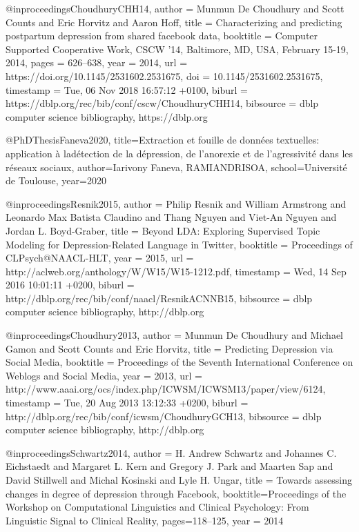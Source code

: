 @inproceedings{ChoudhuryCHH14,
	author    = {Munmun De Choudhury and
	Scott Counts and
	Eric Horvitz and
	Aaron Hoff},
	title     = {Characterizing and predicting postpartum depression from shared facebook
	data},
	booktitle = {Computer Supported Cooperative Work, {CSCW} '14, Baltimore, MD, USA,
	February 15-19, 2014},
	pages     = {626--638},
	year      = {2014},
	url       = {https://doi.org/10.1145/2531602.2531675},
	doi       = {10.1145/2531602.2531675},
	timestamp = {Tue, 06 Nov 2018 16:57:12 +0100},
	biburl    = {https://dblp.org/rec/bib/conf/cscw/ChoudhuryCHH14},
	bibsource = {dblp computer science bibliography, https://dblp.org}
}

@PhDThesis{Faneva2020,
	title={Extraction et fouille de données textuelles: application à ladétection de la dépression, de l'anorexie et de l'agressivité dans les réseaux sociaux},
   author={Iarivony Faneva, RAMIANDRISOA},
   school={Université de Toulouse},
	year={2020}
}

@inproceedings{Resnik2015,
	author    = {Philip Resnik and
	William Armstrong and
	Leonardo Max Batista Claudino and
	Thang Nguyen and
	Viet{-}An Nguyen and
	Jordan L. Boyd{-}Graber},
	title     = {Beyond {LDA:} Exploring Supervised Topic Modeling for Depression-Related
	Language in {Twitter}},
	booktitle = {Proceedings of CLPsych@NAACL-HLT}, 
	year      = {2015},
	url       = {http://aclweb.org/anthology/W/W15/W15-1212.pdf},
	timestamp = {Wed, 14 Sep 2016 10:01:11 +0200},
	biburl    = {http://dblp.org/rec/bib/conf/naacl/ResnikACNNB15},
	bibsource = {dblp computer science bibliography, http://dblp.org}
}

@inproceedings{Choudhury2013,
	author    = {Munmun De Choudhury and
	Michael Gamon and
	Scott Counts and
	Eric Horvitz},
	title     = {Predicting Depression via Social Media},
	booktitle = {Proceedings of the Seventh International Conference on Weblogs and
	Social Media}, 
	year      = {2013},
	url       = {http://www.aaai.org/ocs/index.php/ICWSM/ICWSM13/paper/view/6124},
	timestamp = {Tue, 20 Aug 2013 13:12:33 +0200},
	biburl    = {http://dblp.org/rec/bib/conf/icwsm/ChoudhuryGCH13},
	bibsource = {dblp computer science bibliography, http://dblp.org}
}

@inproceedings{Schwartz2014,
	author    = {H. Andrew Schwartz and
	Johannes C. Eichstaedt and
	Margaret L. Kern and
	Gregory J. Park and
	Maarten Sap and
	David Stillwell and
	Michal Kosinski and
	Lyle H. Ungar},
	title     = {Towards assessing changes in degree of depression through Facebook},
	booktitle={Proceedings of the Workshop on Computational Linguistics and Clinical Psychology: From Linguistic Signal to Clinical Reality}, 
	pages={118--125},
	year      = {2014}
}

